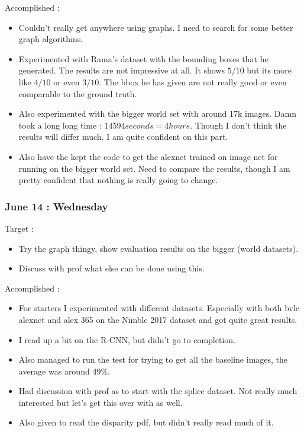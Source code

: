 \documentclass{article}
\begin{document}
Accomplished :
\begin{itemize}
\item Couldn't really get anywhere using graphs. I need to search for some better graph algorithms.
\item Experimented with Rama's dataset with the bounding boxes that he generated. The results are not impressive at all. It shows $5/10$ but its more like $4/10$ or even $3/10$. The bbox he has given are not really good or even comparable to the ground truth.
\item Also experimented with the bigger world set with around 17k images. Damn took a long long time : $14594 seconds = 4 hours$. Though I don't think the results will differ much. I am quite confident on this part.
\item Also have the kept the code to get the alexnet trained on image net for running on the bigger world set. Need to compare the results, though I am pretty confident that nothing is really going to change.
\end{itemize}

\subsubsection{June 14 : Wednesday}
Target :
\begin{itemize}
\item Try the graph thingy, show evaluation results on the bigger (world datasets).
\item Discuss with prof what else can be done using this.
\end{itemize}

Accomplished :
\begin{itemize}
\item For starters I experimented with different datasets. Especially with both bvlc alexnet and alex 365 on the Nimble 2017 dataset and got quite great results.
\item I read up a bit on the R-CNN, but didn't go to completion.
\item Also managed to run the test for trying to get all the baseline images, the average was around 49\%.
\item Had discussion with prof as to start with the splice dataset. Not really much interested but let's get this over with as well.
\item Also given to read the disparity pdf, but didn't really read much of it.
\end{itemize}
\end{document}
